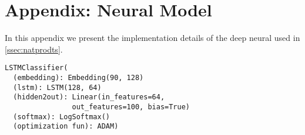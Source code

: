\documentclass[acmsmall, review, anonymous]{acmart}\settopmatter{printfolios=true,printccs=false,printacmref=false}
\newcommand{\qqpi}[2]{[\![#2]\!]_{#1}}
\newcommand{\restate}[1]{\textsc{Restatement of #1}. \hspace*{1pt} \it}
\begin{document}









\section{Appendix: Neural Model }\label{app:neural} 
In this appendix we present the implementation details of the deep neural  used in \cref{ssec:natprodts}.
\begin{lstlisting}[numbers=none,caption={Our Character Level \textit{LSTM} model.},captionpos=b]
  LSTMClassifier(
  (embedding): Embedding(90, 128)
  (lstm): LSTM(128, 64)
  (hidden2out): Linear(in_features=64, 
                out_features=100, bias=True)
  (softmax): LogSoftmax()
  (optimization fun): ADAM)
\end{lstlisting}
\end{document}
